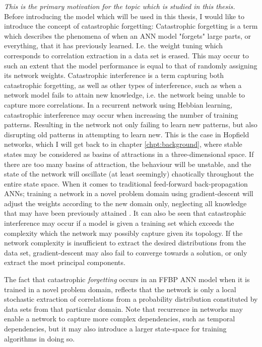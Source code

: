 \textit{This is the primary motivation for the topic which is studied in this thesis.}
\\

Before introducing the model which will be used in this thesis, I would like to introduce the concept of catastrophic forgetting:
Catastrophic forgetting \citep{McCloskey1989, Ratcliff1990} is a term which describes the phenomena of when an ANN model "forgets" large parts, or everything, that it has previously learned. I.e. the weight tuning which corresponds to correlation extraction in a data set is erased. This may occur to such an extent that the model performance is equal to that of randomly assigning its network weights. Catastrophic interference is a term capturing both catastrophic forgetting, as well as other types of interference, such as when a network model fails to attain new knowledge, i.e. the network being unable to capture more correlations. In a recurrent network using Hebbian learning, catastrophic interference may occur when increasing the number of training patterns. Resulting in the network not only failing to learn new patterns, but also disrupting old patterns in attempting to learn new. This is the case in Hopfield networks, which I will get back to in chapter \ref{chpt:background}, where stable states may be considered as basins of attractions in a three-dimensional space. If there are too many basins of attraction, the behaviour will be unstable, and the state of the network will oscillate (at least seemingly) chaotically throughout the entire state space.
When it comes to traditional feed-forward back-propagation ANNs; training a network in a novel problem domain using gradient-descent will adjust the weights according to the new domain only, neglecting all knowledge that may have been previously attained \citep{McCloskey1989, French1999, French2001}.
It can also be seen that catastrophic interference may occur if a model is given a training set which exceeds the complexity which the network may possibly capture given its topology. If the network complexity is insufficient to extract the desired distributions from the data set, gradient-descent may also fail to converge towards a solution, or only extract the most principal components.

The fact that catastrophic \textit{forgetting} occurs in an FFBP ANN model when it is trained in a novel problem domain, reflects that the network is only a local stochastic extraction of correlations from a probability distribution constituted by data sets from that particular domain. Note that recurrence in networks may enable a network to capture more complex dependencies, such as temporal dependencies, but it may also introduce a larger state-space for training algorithms in doing so.
\\

